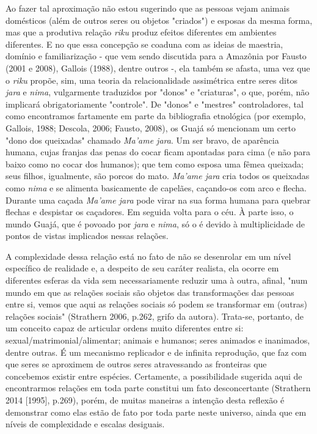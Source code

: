 Ao fazer tal aproximação não estou sugerindo que as pessoas vejam
animais domésticos (além de outros seres ou objetos "criados") e esposas
da mesma forma, mas que a produtiva relação \emph{riku} produz efeitos
diferentes em ambientes diferentes. E no que essa concepção se coaduna
com as ideias de maestria, domínio e familiarização - que vem sendo
discutida para a Amazônia por Fausto (2001 e 2008), Gallois (1988),
dentre outros -, ela também se afasta, uma vez que o \emph{riku} propõe,
sim, uma teoria da relacionalidade assimétrica entre seres ditos
\emph{jara} e \emph{nima}, vulgarmente traduzidos por "donos" e
"criaturas", o que, porém, não implicará obrigatoriamente "controle". De
"donos" e "mestres" controladores, tal como encontramos fartamente em
parte da bibliografia etnológica (por exemplo, Gallois, 1988; Descola,
2006; Fausto, 2008), os Guajá só mencionam um certo "dono dos queixadas"
chamado \emph{Ma'ame jara}. Um ser bravo, de aparência humana, cujas
franjas das penas do cocar ficam apontadas para cima (e não para baixo
como no cocar dos humanos); que tem como esposa uma fêmea queixada; seus
filhos, igualmente, são porcos do mato. \emph{Ma'ame jara} cria todos os
queixadas como \emph{nima} e se alimenta basicamente de capelães,
caçando-os com arco e flecha. Durante uma caçada \emph{Ma'ame jara} pode
virar na sua forma humana para quebrar flechas e despistar os caçadores.
Em seguida volta para o céu. À parte isso, o mundo Guajá, que é povoado
por \emph{jara} e \emph{nima}, só o é devido à multiplicidade de pontos
de vistas implicados nessas relações.

A complexidade dessa relação está no fato de não se desenrolar em um
nível específico de realidade e, a despeito de seu caráter realista, ela
ocorre em diferentes esferas da vida sem necessariamente reduzir uma à
outra, afinal, "num mundo em que as relações sociais são objetos das
transformações das pessoas entre si, vemos que aqui as relações sociais
só podem se transformar em (outras) relações sociais" (Strathern 2006,
p.262, grifo da autora). Trata-se, portanto, de um conceito capaz de
articular ordens muito diferentes entre si:
sexual/matrimonial/alimentar; animais e humanos; seres animados e
inanimados, dentre outras. É um mecanismo replicador e de infinita
reprodução, que faz com que seres se aproximem de outros seres
atravessando as fronteiras que concebemos existir entre espécies.
Certamente, a possibilidade sugerida aqui de encontrarmos relações em
toda parte constitui um fato desconcertante (Strathern 2014 {[}1995{]},
p.269), porém, de muitas maneiras a intenção desta reflexão é demonstrar
como elas estão de fato por toda parte neste universo, ainda que em
níveis de complexidade e escalas desiguais.

